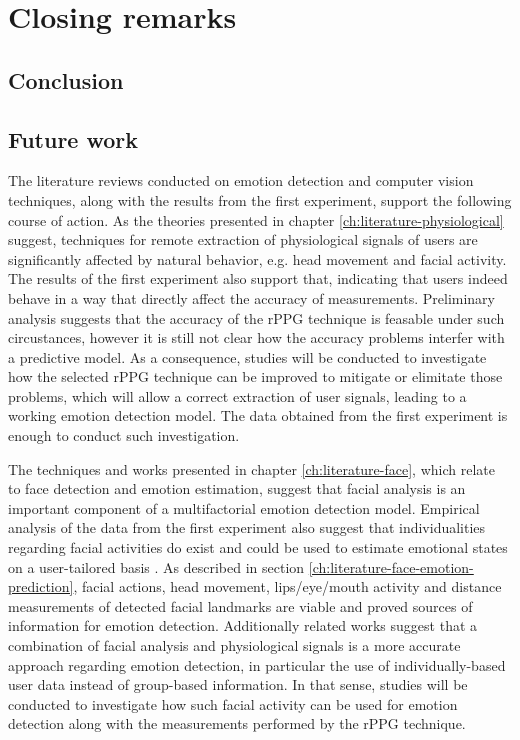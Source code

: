 \chapter{Closing remarks}
\label{ch:closing}

\section{Conclusion}

\section{Future work}

The literature reviews conducted on emotion detection and computer vision techniques, along with the results from the first experiment, support the following course of action. As the theories presented in chapter \ref{ch:literature-physiological} suggest, techniques for remote extraction of physiological signals of users are significantly affected by natural behavior, e.g. head movement and facial activity. The results of the first experiment also support that, indicating that users indeed behave in a way that directly affect the accuracy of measurements. Preliminary analysis \parencite{bevilacqua2017accuracy} suggests that the accuracy of the rPPG technique is feasable under such circustances, however it is still not clear how the accuracy problems interfer with a predictive model. As a consequence, studies will be conducted to investigate how the selected rPPG technique can be improved to mitigate or elimitate those problems, which will allow a correct extraction of user signals, leading to a working emotion detection model. The data obtained from the first experiment is enough to conduct such investigation.

The techniques and works presented in chapter \ref{ch:literature-face}, which relate to face detection and emotion estimation, suggest that facial analysis is an important component of a multifactorial emotion detection model. Empirical analysis of the data from the first experiment also suggest that individualities regarding facial activities do exist and could be used to estimate emotional states on a user-tailored basis \parencite{bevilacqua2016variations}. As described in section \ref{ch:literature-face-emotion-prediction}, facial actions, head movement, lips/eye/mouth activity and distance measurements of detected facial landmarks are viable and proved sources of information for emotion detection. Additionally related works suggest that a combination of facial analysis and physiological signals is a more accurate approach regarding emotion detection, in particular the use of individually-based user data instead of group-based information. In that sense, studies will be conducted to investigate how such facial activity can be used for emotion detection along with the measurements performed by the rPPG technique.

